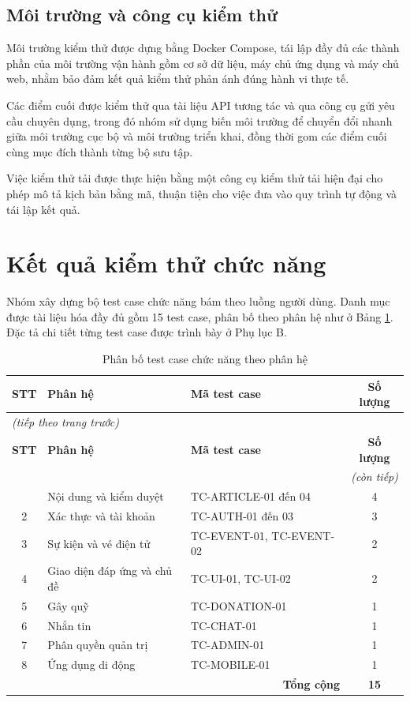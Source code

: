 \documentclass[12pt,a4paper,oneside]{report}
\begin{document}
\subsection{Môi trường và công cụ kiểm thử}

Môi trường kiểm thử được dựng bằng Docker Compose, tái lập đầy đủ các thành phần của môi trường vận hành gồm cơ sở dữ liệu, máy chủ ứng dụng và máy chủ web, nhằm bảo đảm kết quả kiểm thử phản ánh đúng hành vi thực tế.

Các điểm cuối được kiểm thử qua tài liệu API tương tác và qua công cụ gửi yêu cầu chuyên dụng, trong đó nhóm sử dụng biến môi trường để chuyển đổi nhanh giữa môi trường cục bộ và môi trường triển khai, đồng thời gom các điểm cuối cùng mục đích thành từng bộ sưu tập.

Việc kiểm thử tải được thực hiện bằng một công cụ kiểm thử tải hiện đại cho phép mô tả kịch bản bằng mã, thuận tiện cho việc đưa vào quy trình tự động và tái lập kết quả.

\section{Kết quả kiểm thử chức năng}

Nhóm xây dựng bộ test case chức năng bám theo luồng người dùng. Danh mục được tài liệu hóa đầy đủ gồm 15 test case, phân bố theo phân hệ như ở Bảng \ref{tab:testcases}. Đặc tả chi tiết từng test case được trình bày ở Phụ lục B.

\renewcommand{\arraystretch}{1.25}
{\small
\begin{longtable}{|c|>{\raggedright\arraybackslash}p{5.4cm}|>{\raggedright\arraybackslash}p{4.6cm}|c|}
\caption{Phân bố test case chức năng theo phân hệ}\label{tab:testcases}\\
\hline \textbf{STT} & \textbf{Phân hệ} & \textbf{Mã test case} & \textbf{Số lượng} \\ \hline
\endfirsthead
\multicolumn{4}{l}{\itshape\small (tiếp theo trang trước)}\\[2pt]
\hline \textbf{STT} & \textbf{Phân hệ} & \textbf{Mã test case} & \textbf{Số lượng} \\ \hline
\endhead
\hline \multicolumn{4}{r}{\itshape\small (còn tiếp)}\\
\endfoot
\hline
\endlastfoot
1 & Nội dung và kiểm duyệt & TC-ARTICLE-01 đến 04 & 4 \\ \hline
2 & Xác thực và tài khoản & TC-AUTH-01 đến 03 & 3 \\ \hline
3 & Sự kiện và vé điện tử & TC-EVENT-01, TC-EVENT-02 & 2 \\ \hline
4 & Giao diện đáp ứng và chủ đề & TC-UI-01, TC-UI-02 & 2 \\ \hline
5 & Gây quỹ & TC-DONATION-01 & 1 \\ \hline
6 & Nhắn tin & TC-CHAT-01 & 1 \\ \hline
7 & Phân quyền quản trị & TC-ADMIN-01 & 1 \\ \hline
8 & Ứng dụng di động & TC-MOBILE-01 & 1 \\ \hline
\multicolumn{3}{|r|}{\textbf{Tổng cộng}} & \textbf{15} \\ \hline
\end{longtable}
}
\renewcommand{\arraystretch}{1}
\end{document}
